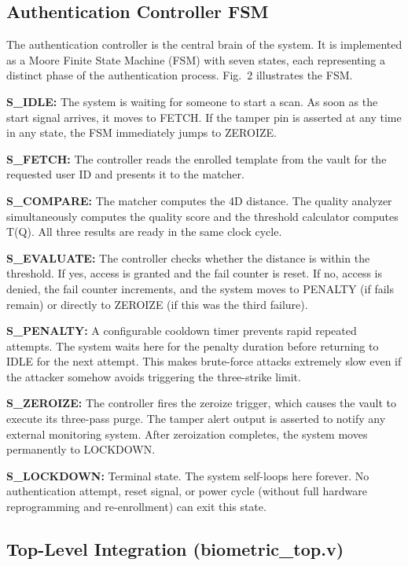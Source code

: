 \documentclass[conference]{IEEEtran}
\begin{document}
\subsection{Authentication Controller FSM}

The authentication controller is the central brain of the system.
It is implemented as a Moore Finite State Machine (FSM) with seven
states, each representing a distinct phase of the authentication
process. Fig.~2 illustrates the FSM.

\textbf{S\_IDLE:} The system is waiting for someone to start a
scan. As soon as the start signal arrives, it moves to FETCH.
If the tamper pin is asserted at any time in any state, the FSM
immediately jumps to ZEROIZE.

\textbf{S\_FETCH:} The controller reads the enrolled template from
the vault for the requested user ID and presents it to the matcher.

\textbf{S\_COMPARE:} The matcher computes the 4D distance. The
quality analyzer simultaneously computes the quality score and
the threshold calculator computes T(Q). All three results are
ready in the same clock cycle.

\textbf{S\_EVALUATE:} The controller checks whether the distance
is within the threshold. If yes, access is granted and the fail
counter is reset. If no, access is denied, the fail counter
increments, and the system moves to PENALTY (if fails remain)
or directly to ZEROIZE (if this was the third failure).

\textbf{S\_PENALTY:} A configurable cooldown timer prevents rapid
repeated attempts. The system waits here for the penalty duration
before returning to IDLE for the next attempt. This makes
brute-force attacks extremely slow even if the attacker somehow
avoids triggering the three-strike limit.

\textbf{S\_ZEROIZE:} The controller fires the zeroize trigger,
which causes the vault to execute its three-pass purge. The
tamper alert output is asserted to notify any external monitoring
system. After zeroization completes, the system moves permanently
to LOCKDOWN.

\textbf{S\_LOCKDOWN:} Terminal state. The system self-loops here
forever. No authentication attempt, reset signal, or power cycle
(without full hardware reprogramming and re-enrollment) can exit
this state.

\subsection{Top-Level Integration (biometric\_top.v)}
\end{document}
